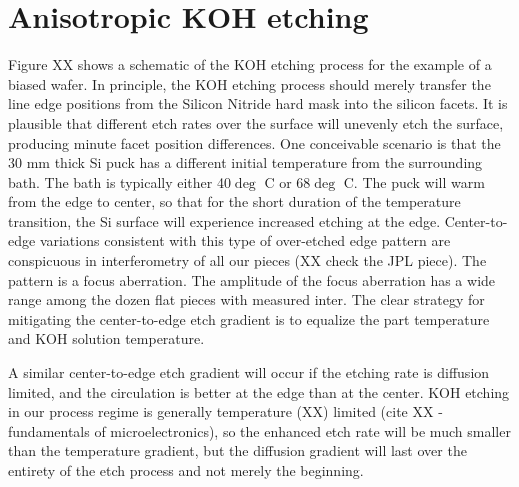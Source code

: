 \section{Anisotropic KOH etching}
Figure XX shows a schematic of the KOH etching process for the example of a biased wafer.
In principle, the KOH etching process should merely transfer the line edge positions from the Silicon Nitride hard mask into the silicon facets.  It is plausible that different etch rates over the surface will unevenly etch the surface, producing minute facet position differences.  One conceivable scenario is that the 30 mm thick Si puck has a different initial temperature from the surrounding bath.  The bath is typically either 40$\deg$ C or 68$\deg$ C.  The puck will warm from the edge to center, so that for the short duration of the temperature transition, the Si surface will experience increased etching at the edge.  Center-to-edge variations consistent with this type of over-etched edge pattern are conspicuous in interferometry of all our pieces (XX check the JPL piece).  The pattern is a focus aberration.  The amplitude of the focus aberration has a wide range among the dozen flat pieces with measured inter.  The clear strategy for mitigating the center-to-edge etch gradient is to equalize the part temperature and KOH solution temperature.

A similar center-to-edge etch gradient will occur if the etching rate is diffusion limited, and the circulation is better at the edge than at the center.  KOH etching in our process regime is generally temperature (XX) limited (cite XX -fundamentals of microelectronics), so the enhanced etch rate will be much smaller than the temperature gradient, but the diffusion gradient will last over the entirety of the etch process and not merely the beginning.

